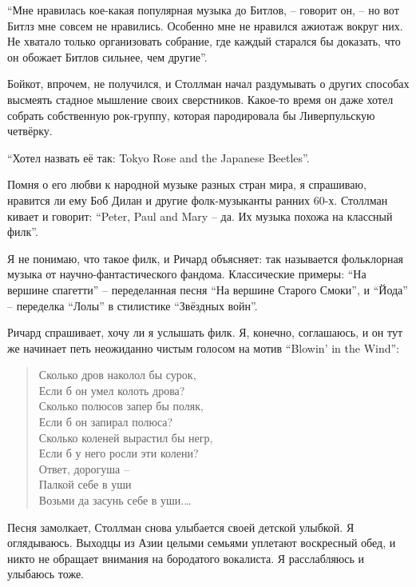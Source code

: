 \enquote{Мне нравилась кое-какая популярная музыка до Битлов, -- говорит он, -- но вот Битлз мне совсем не нравились. Особенно мне не нравился ажиотаж вокруг них. Не хватало только организовать собрание, где каждый старался бы доказать, что он обожает Битлов сильнее, чем другие}.

Бойкот, впрочем, не получился, и Столлман начал раздумывать о других способах высмеять стадное мышление своих сверстников. Какое-то время он даже хотел собрать собственную рок-группу, которая пародировала бы Ливерпульскую четвёрку.

\enquote{Хотел назвать её так: Tokyo Rose and the Japanese Beetles}.

Помня о его любви к народной музыке разных стран мира, я спрашиваю, нравится ли ему Боб Дилан и другие фолк-музыканты ранних 60-х. Столлман кивает и говорит: \enquote{Peter, Paul and Mary -- да. Их музыка похожа на классный филк}.

Я не понимаю, что такое филк, и Ричард объясняет: так называется фольклорная музыка от научно-фантастического фандома. Классические примеры: \enquote{На вершине спагетти} -- переделанная песня \enquote{На вершине Старого Смоки}, и \enquote{Йода} -- переделка  \enquote{Лолы} в стилистике \enquote{Звёздных войн}.

Ричард спрашивает, хочу ли я услышать филк. Я, конечно, соглашаюсь, и он тут же начинает петь неожиданно чистым голосом на мотив \enquote{Blowin' in the Wind}:

\begin{verse}
Сколько дров наколол бы сурок,\\
Если б он умел колоть дрова?\\
Сколько полюсов запер бы поляк,\\
Если б он запирал полюса?\\
Сколько коленей вырастил бы негр,\\
Если б у него росли эти колени?\\
Ответ, дорогуша --\\
Палкой себе в уши\\
Возьми да засунь себе в уши.\ldots
\end{verse}

Песня замолкает, Столлман снова улыбается своей детской улыбкой. Я оглядываюсь. Выходцы из Азии целыми семьями уплетают воскресный обед, и никто не обращает внимания на бородатого вокалиста. Я расслабляюсь и улыбаюсь тоже. 

